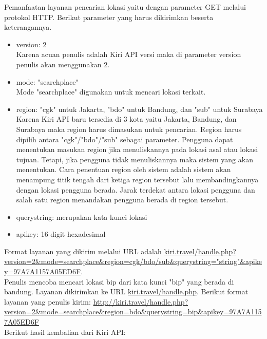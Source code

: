 \hspace{0.5cm} Pemanfaatan layanan pencarian lokasi yaitu dengan parameter GET melalui protokol HTTP. Berikut parameter yang harus dikirimkan beserta keterangannya.
\begin{itemize}
	\item version: 2 \\
	Karena acuan penulis adalah Kiri API versi maka di parameter version penulis akan menggunakan 2.
	\item mode: "searchplace" \\
	Mode "searchplace" digunakan untuk mencari lokasi terkait.
	\item region: "cgk" untuk Jakarta, "bdo" untuk Bandung, dan "sub" untuk Surabaya \\
	Karena Kiri API baru tersedia di 3 kota yaitu Jakarta, Bandung, dan Surabaya maka region harus dimasukan untuk pencarian. Region harus dipilih antara "cgk"/"bdo"/"sub" sebagai parameter. Pengguna dapat menentukan masukan region jika menuliskannya pada lokasi asal atau lokasi tujuan. Tetapi, jika pengguna tidak menuliskannya maka sistem yang akan menentukan. Cara penentuan region oleh sistem adalah sistem akan menampung titik tengah dari ketiga region tersebut lalu membandingkannya dengan lokasi pengguna berada. Jarak terdekat antara lokasi pengguna dan salah satu region menandakan pengguna berada di region tersebut.
	\item querystring: merupakan kata kunci lokasi 
	\item apikey: 16 digit hexadesimal
\end{itemize}
Format layanan yang dikirim melalui URL adalah \url{kiri.travel/handle.php?version=2&mode=searchplace&region=cgk/bdo/sub&querystring="string"&apikey=97A7A1157A05ED6F}.
\newline
\\Penulis mencoba mencari lokasi bip dari kata kunci "bip" yang berada di bandung. Layanan dikirimkan ke URL \url{kiri.travel/handle.php}. 
Berikut format layanan yang penulis kirim:\newline
{\url{http://kiri.travel/handle.php?version=2&mode=searchplace&region=bdo&querystring=bip&apikey=97A7A1157A05ED6F}}
\newline
\\Berikut hasil kembalian dari Kiri API: 

